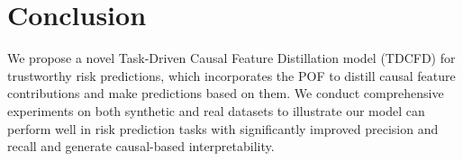 \documentclass[letterpaper]{article} %
\theoremstyle{definition}
\theoremstyle{remark}
\begin{document}
 






\section{Conclusion}

We propose a novel Task-Driven Causal Feature Distillation model (TDCFD) for trustworthy risk predictions, which incorporates the POF to distill causal feature contributions and make predictions based on them. We conduct comprehensive experiments on both synthetic and real datasets to illustrate our model can perform well in risk prediction tasks with significantly improved precision and recall and generate causal-based interpretability.





\end{document}
